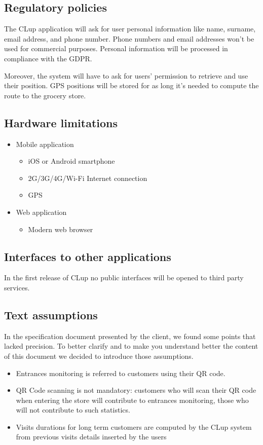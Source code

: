 \subsection{Regulatory policies}
The CLup application will ask for user personal information like name, surname, email address, and phone number. Phone numbers and email addresses won't be used for commercial purposes.
Personal information will be processed in compliance with the GDPR.

Moreover, the system will have to ask for users' permission to retrieve and use their position. GPS positions will be stored for as long it's needed to compute the route to the grocery store.

\subsection{Hardware limitations}
\label{hardware limitations}
\begin{itemize}
    \item Mobile application
    \begin{itemize}
        \item iOS or Android smartphone
        \item 2G/3G/4G/Wi-Fi Internet connection
        \item GPS
    \end{itemize}
    \item Web application
    \begin{itemize}
        \item Modern web browser
    \end{itemize}
\end{itemize}

\subsection{Interfaces to other applications}
In the first release of CLup no public interfaces will be opened to third party services.

\subsection{Text assumptions}
In the specification document presented by the client, we found some points that lacked precision. To better clarify and to make you understand better the content of this document we decided to introduce those assumptions.
\begin{itemize}
    \item Entrances monitoring is referred to customers using their QR code.
    \item QR Code scanning is not mandatory: customers who will scan their QR code when entering the store will contribute to entrances monitoring, those who will not contribute to such statistics.
    \item Visits durations for long term customers are computed by the CLup system from previous visits details inserted by the users
\end{itemize}

